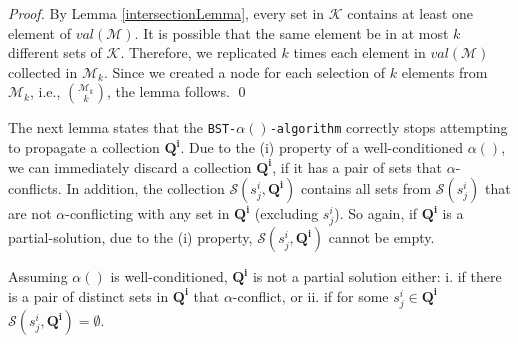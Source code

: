 \begin{proof}
By Lemma \ref{intersectionLemma}, every set in $\mathcal{K}$ contains at least one element of $val(\mathcal{M})$. 
It is possible that the same element be in at most $k$ different sets of $\mathcal{K}$. Therefore, we replicated $k$ times each element in $val(\mathcal{M})$ collected in $\mathcal{M}_k$. 
Since we created a node for each selection of $k$ elements from $\mathcal{M}_k$, i.e., $\binom{\mathcal{M}_k}{k}$, the lemma follows. \qed
\end{proof}

The next lemma states that the \texttt{BST-$\alpha()$-algorithm} correctly stops attempting to propagate a collection $\mathbf{Q^i}$.
Due to the (i) property of a well-conditioned $\alpha()$, we can immediately discard a collection $\mathbf{Q^i}$, if it has a pair of sets that $\alpha$-conflicts. In addition, the collection $\mathcal{S}(s^i_j,\mathbf{Q^i})$ contains all sets from $ \mathcal{S}(s^i_j)$ that are not $\alpha$-conflicting with any set in $\mathbf{Q^i}$ (excluding $s^i_j$). So again, if $\mathbf{Q^i}$ is a partial-solution, due to the (i) property, $\mathcal{S}(s^i_j,\mathbf{Q^i})$ cannot be empty. 

\begin{lemma}\label{terminationLemma}
Assuming $\alpha()$ is well-conditioned, $\mathbf{Q^i}$ is not a partial solution either: i. if there is a pair of distinct sets in $\mathbf{Q^i}$ that $\alpha$-conflict, or ii. if for some $s^i_j \in \mathbf{Q^i}$ $\mathcal{S}(s^i_j,\mathbf{Q^i})=\emptyset$.
\end{lemma}

